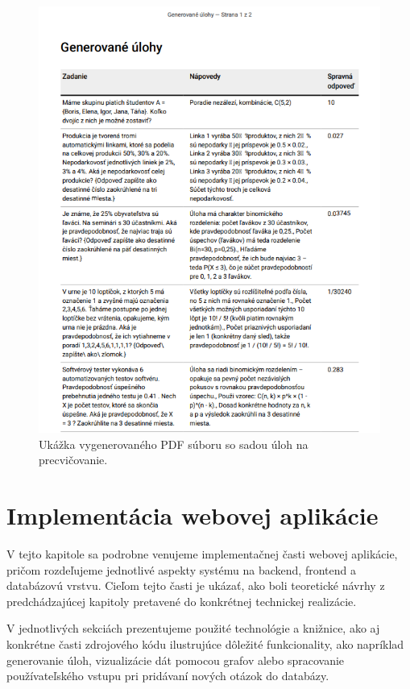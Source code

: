 \begin{figure}[h!]
  \centering
  \includegraphics[width=14cm]{img/pdf.png}
  \caption{Ukážka vygenerovaného PDF súboru so sadou úloh na precvičovanie.}
  \label{pdf-export}
\end{figure}


 \section{Implementácia webovej aplikácie}
 V tejto kapitole sa podrobne venujeme implementačnej časti webovej aplikácie, pričom rozdeľujeme jednotlivé aspekty systému na backend, frontend a databázovú vrstvu.
  Cieľom tejto časti je ukázať, ako boli teoretické návrhy z predchádzajúcej kapitoly pretavené do konkrétnej technickej realizácie.

 V jednotlivých sekciách prezentujeme použité technológie a knižnice, ako aj konkrétne časti zdrojového kódu ilustrujúce dôležité funkcionality, 
 ako napríklad generovanie úloh, vizualizácie dát pomocou grafov alebo spracovanie používateľského vstupu pri pridávaní nových otázok do databázy.

